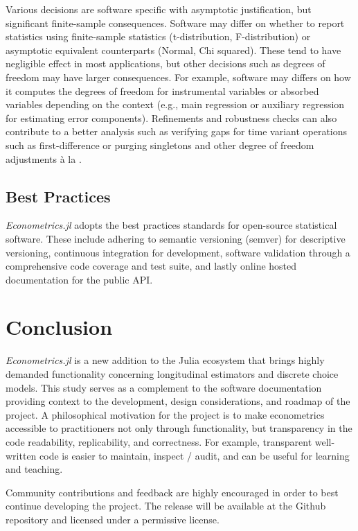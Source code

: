 \documentclass{juliacon}
\begin{document}
Various decisions are software specific with asymptotic justification, but significant finite-sample consequences. Software may differ on whether to report statistics using finite-sample statistics (t-distribution, F-distribution) or asymptotic equivalent counterparts (Normal, Chi squared). These tend to have negligible effect in most applications, but other decisions such as degrees of freedom may have larger consequences. For example, software may differs on how it computes the degrees of freedom for instrumental variables or absorbed variables depending on the context (e.g., main regression or auxiliary regression for estimating error components). Refinements and robustness checks can also contribute to a better analysis such as verifying gaps for time variant operations such as first-difference or purging singletons and other degree of freedom adjustments à la \cite{Singletons}.

\subsection{Best Practices}

\textit{Econometrics.jl} adopts the best practices standards for open-source statistical software. These include adhering to semantic versioning (semver) for descriptive versioning, continuous integration for development, software validation through a comprehensive code coverage and test suite, and lastly online hosted documentation for the public API.

\section{Conclusion}

\textit{Econometrics.jl} is a new addition to the Julia ecosystem that brings highly demanded functionality concerning longitudinal estimators and discrete choice models. This study serves as a complement to the software documentation providing context to the development, design considerations, and roadmap of the project. A philosophical motivation for the project is to make econometrics accessible to practitioners not only through functionality, but transparency in the code readability, replicability, and correctness. For example, transparent well-written code is easier to maintain, inspect / audit, and can be useful for learning and teaching.

Community contributions and feedback are highly encouraged in order to best continue developing the project. The release will be available at the Github repository and licensed under a permissive license.

\vfill



\appendix
\onecolumn





\end{document}
